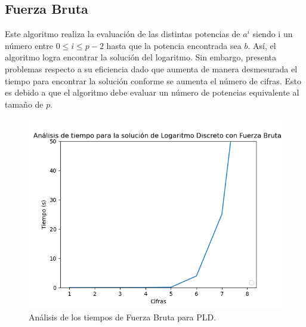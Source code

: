 \documentclass{article}
\begin{document}
    \subsection{Fuerza Bruta}
    Este algoritmo realiza la evaluación de las distintas potencias de \begin{math}a^i\end{math} siendo i un número entre \begin{math} 0\leq i \leq p-2 \end{math} hasta que la potencia encontrada sea \begin{math}b\end{math}. Así, el algoritmo logra encontrar la solución del logaritmo. Sin embargo, presenta problemas respecto a su eficiencia dado que aumenta de manera desmesurada el tiempo para encontrar la solución conforme se aumenta el número de cifras. Esto es debido a que el algoritmo debe evaluar un número de potencias equivalente al tamaño de $p$.
     \begin{figure}[ht!]
        \centering
        \includegraphics[width=\linewidth]{Figure_7}
        \caption{Análisis de los tiempos de Fuerza Bruta para PLD.}
        \label{fig:Figure_6}
    \end{figure}
    \newpage
    
\end{document}
